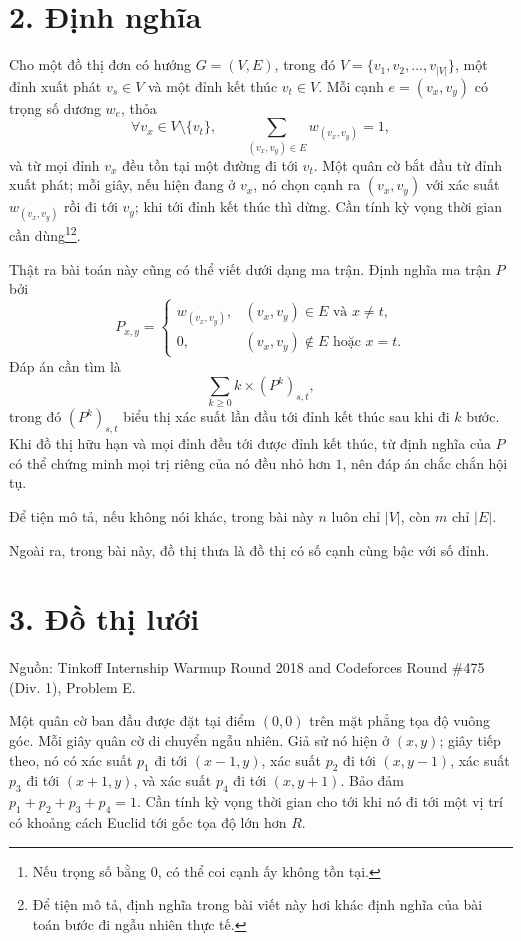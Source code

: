 \documentclass[11pt]{article}
\begin{document}
\section*{2. Định nghĩa}

Cho một đồ thị đơn có hướng \(G=(V,E)\), trong đó
\(V=\{v_1,v_2,\ldots,v_{|V|}\}\), một đỉnh xuất phát \(v_s\in V\) và một đỉnh
kết thúc \(v_t\in V\). Mỗi cạnh \(e=(v_x,v_y)\) có trọng số dương \(w_e\), thỏa
\[
  \forall v_x\in V\setminus\{v_t\},\qquad
  \sum_{(v_x,v_y)\in E}w_{(v_x,v_y)}=1,
\]
và từ mọi đỉnh \(v_x\) đều tồn tại một đường đi tới \(v_t\). Một quân cờ bắt
đầu từ đỉnh xuất phát; mỗi giây, nếu hiện đang ở \(v_x\), nó chọn cạnh ra
\((v_x,v_y)\) với xác suất \(w_{(v_x,v_y)}\) rồi đi tới \(v_y\); khi tới đỉnh
kết thúc thì dừng. Cần tính kỳ vọng thời gian cần dùng\footnote{Nếu trọng số
bằng \(0\), có thể coi cạnh ấy không tồn tại.}\footnote{Để tiện mô tả, định
nghĩa trong bài viết này hơi khác định nghĩa của bài toán bước đi ngẫu nhiên
thực tế.}.

Thật ra bài toán này cũng có thể viết dưới dạng ma trận. Định nghĩa ma trận
\(P\) bởi
\[
  P_{x,y}=
  \begin{cases}
    w_{(v_x,v_y)}, & (v_x,v_y)\in E\text{ và }x\ne t,\\
    0, & (v_x,v_y)\notin E\text{ hoặc }x=t.
  \end{cases}
\]
Đáp án cần tìm là
\[
  \sum_{k\ge0} k\times (P^k)_{s,t},
\]
trong đó \((P^k)_{s,t}\) biểu thị xác suất lần đầu tới đỉnh kết thúc sau khi
đi \(k\) bước. Khi đồ thị hữu hạn và mọi đỉnh đều tới được đỉnh kết thúc, từ
định nghĩa của \(P\) có thể chứng minh mọi trị riêng của nó đều nhỏ hơn \(1\),
nên đáp án chắc chắn hội tụ.

Để tiện mô tả, nếu không nói khác, trong bài này \(n\) luôn chỉ \(|V|\), còn
\(m\) chỉ \(|E|\).

Ngoài ra, trong bài này, đồ thị thưa là đồ thị có số cạnh cùng bậc với số
đỉnh.

\section*{3. Đồ thị lưới}

\paragraph{}
Nguồn: Tinkoff Internship Warmup Round 2018 and Codeforces Round \#475
(Div. 1), Problem E.

Một quân cờ ban đầu được đặt tại điểm \((0,0)\) trên mặt phẳng tọa độ vuông
góc. Mỗi giây quân cờ di chuyển ngẫu nhiên. Giả sử nó hiện ở \((x,y)\); giây
tiếp theo, nó có xác suất \(p_1\) đi tới \((x-1,y)\), xác suất \(p_2\) đi tới
\((x,y-1)\), xác suất \(p_3\) đi tới \((x+1,y)\), và xác suất \(p_4\) đi tới
\((x,y+1)\). Bảo đảm \(p_1+p_2+p_3+p_4=1\). Cần tính kỳ vọng thời gian cho tới
khi nó đi tới một vị trí có khoảng cách Euclid tới gốc tọa độ lớn hơn \(R\).
\end{document}
